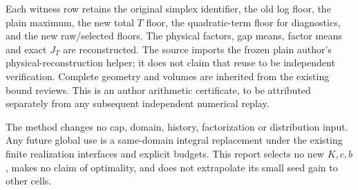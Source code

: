Each witness row retains the original simplex identifier, the old log
floor, the plain maximum, the new total $T$ floor, the quadratic-term
floor for diagnostics, and the new raw/selected floors. The physical
factors, gap means, factor means and exact $J_T$ are reconstructed.
The source imports the frozen plain author's physical-reconstruction
helper; it does not claim that reuse to be independent verification.
Complete geometry and volumes are inherited from the existing bound
reviews. This is an author arithmetic certificate, to be attributed
separately from any subsequent independent numerical replay.

The method changes no cap, domain, history, factorization or distribution
input. Any future global use is a same-domain integral replacement
under the existing finite realization interfaces and explicit budgets.
This report selects no new $K,c,b$, makes no claim of optimality, and
does not extrapolate its small seed gain to other cells.
